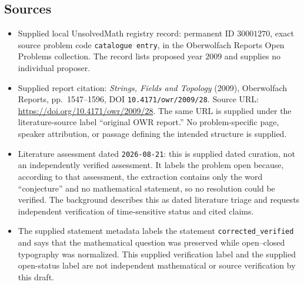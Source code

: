 \documentclass[11pt]{article}
\begin{document}
\subsection{Sources}
\begin{itemize}
\item Supplied local UnsolvedMath registry record: permanent ID \(30001270\), exact source problem code \texttt{catalogue entry}, in the Oberwolfach Reports Open Problems collection. The record lists proposed year \(2009\) and supplies no individual proposer.
\item Supplied report citation: \emph{Strings, Fields and Topology} (2009), Oberwolfach Reports, pp.\ 1547--1596, DOI \texttt{10.4171/owr/2009/28}. Source URL: \url{https://doi.org/10.4171/owr/2009/28}. The same URL is supplied under the literature-source label ``original OWR report.'' No problem-specific page, speaker attribution, or passage defining the intended structure is supplied.
\item Literature assessment dated \texttt{2026-08-21}: this is supplied dated curation, not an independently verified assessment. It labels the problem open because, according to that assessment, the extraction contains only the word ``conjecture'' and no mathematical statement, so no resolution could be verified. The background describes this as dated literature triage and requests independent verification of time-sensitive status and cited claims.
\item The supplied statement metadata labels the statement \texttt{corrected\_verified} and says that the mathematical question was preserved while open--closed typography was normalized. This supplied verification label and the supplied open-status label are not independent mathematical or source verification by this draft.
\end{itemize}
\end{document}
